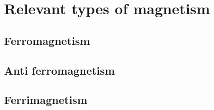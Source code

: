\section{Relevant types of magnetism}
\subsection{Ferromagnetism}


\subsection{Anti ferromagnetism}



\subsection{Ferrimagnetism}